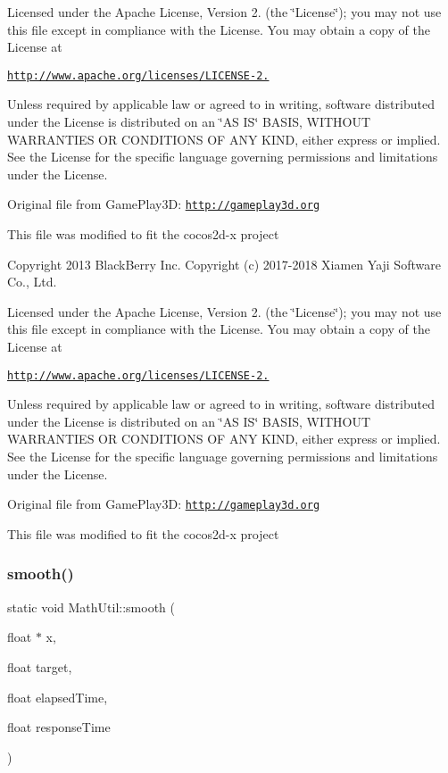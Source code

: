 Licensed under the Apache License, Version 2. (the \char`\"{}\+License\char`\"{}); you may not use this file except in compliance with the License. You may obtain a copy of the License at

\href{http://www.apache.org/licenses/LICENSE-2.0}{\tt http\+://www.\+apache.\+org/licenses/\+L\+I\+C\+E\+N\+S\+E-\/2.}

Unless required by applicable law or agreed to in writing, software distributed under the License is distributed on an \char`\"{}\+A\+S I\+S\char`\"{} B\+A\+S\+IS, W\+I\+T\+H\+O\+UT W\+A\+R\+R\+A\+N\+T\+I\+ES OR C\+O\+N\+D\+I\+T\+I\+O\+NS OF A\+NY K\+I\+ND, either express or implied. See the License for the specific language governing permissions and limitations under the License.

Original file from Game\+Play3D\+: \href{http://gameplay3d.org}{\tt http\+://gameplay3d.\+org}

This file was modified to fit the cocos2d-\/x project

Copyright 2013 Black\+Berry Inc. Copyright (c) 2017-\/2018 Xiamen Yaji Software Co., Ltd.

Licensed under the Apache License, Version 2. (the \char`\"{}\+License\char`\"{}); you may not use this file except in compliance with the License. You may obtain a copy of the License at

\href{http://www.apache.org/licenses/LICENSE-2.0}{\tt http\+://www.\+apache.\+org/licenses/\+L\+I\+C\+E\+N\+S\+E-\/2.}

Unless required by applicable law or agreed to in writing, software distributed under the License is distributed on an \char`\"{}\+A\+S I\+S\char`\"{} B\+A\+S\+IS, W\+I\+T\+H\+O\+UT W\+A\+R\+R\+A\+N\+T\+I\+ES OR C\+O\+N\+D\+I\+T\+I\+O\+NS OF A\+NY K\+I\+ND, either express or implied. See the License for the specific language governing permissions and limitations under the License.

Original file from Game\+Play3D\+: \href{http://gameplay3d.org}{\tt http\+://gameplay3d.\+org}

This file was modified to fit the cocos2d-\/x project \mbox{\label{classMathUtil_a1891148f59e1bdc9070cf11ec14b9882}} 
\subsubsection{\texorpdfstring{smooth()}{smooth()}\hspace{0.1cm}{\footnotesize\ttfamily [2/4]}}
{\footnotesize\ttfamily static void Math\+Util\+::smooth (\begin{DoxyParamCaption}\item[{float $\ast$}]{x,  }\item[{float}]{target,  }\item[{float}]{elapsed\+Time,  }\item[{float}]{response\+Time }\end{DoxyParamCaption})\hspace{0.3cm}{\ttfamily [static]}}


